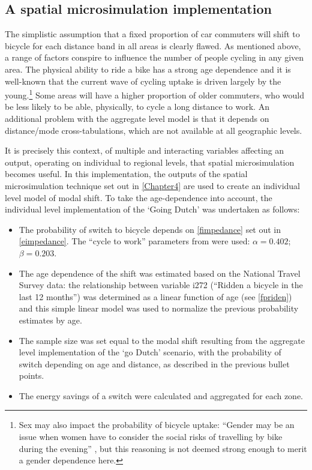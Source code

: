 \documentclass[a4paper, 11pt, twoside]{Thesis}
\begin{document}
\subsection{A spatial microsimulation implementation}
The simplistic assumption that a fixed proportion of car commuters will
shift to bicycle for each distance band in all areas is clearly flawed.
As mentioned above, a range of factors conspire to influence the number of
people cycling in any given area. The physical ability to ride a bike
has a strong age dependence and it is well-known that the current wave
of cycling uptake is driven largely by the
young.\footnote{Sex
may also impact the probability of bicycle uptake: ``Gender may be an issue when
women have to consider the social risks of travelling by bike during the
evening'' \citep[p.~532]{Rietveld2004}, but this reasoning is not deemed
strong enough to merit a gender dependence here.
}
Some areas will have a higher proportion of older commuters, who would
be less likely to be able, physically, to cycle a long distance to work.
An additional problem with the aggregate level model is that it depends
on distance/mode cross-tabulations, which are not available at all
geographic levels.

It is precisely this context, of multiple and interacting variables
affecting an output, operating on individual to regional levels,
that spatial microsimulation becomes useful. In this implementation,
the outputs of the spatial microsimulation technique set out
in \cref{Chapter4} are used to create an individual level model of modal shift.
To take the age-dependence into account, the individual level implementation
of the `Going Dutch' was undertaken as follows:
\begin{itemize}
\item The probability of switch to bicycle depends on \cref{fimpedance}
set out in \cref{eimpedance}.
The ``cycle to work'' parameters from
\citet{Iacono2010} were used: $\alpha = 0.402$; $\beta = 0.203$.
\item The age dependence of the shift was estimated based on the National
Travel Survey data: the 
relationship between variable i272 (``Ridden a bicycle in the last 12 months'')
was determined as a linear function of age (see \cref{fpriden}) and this
simple linear model was used to normalize the previous probability
estimates by age.
\item The sample size was set equal to the modal shift resulting from the
aggregate level implementation of the `go Dutch' scenario, with the probability
of switch depending on age and distance, as described in the previous bullet points.
\item The energy savings of a switch were calculated and aggregated for each zone.
\end{itemize}
\end{document}
